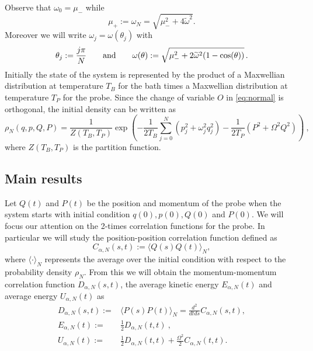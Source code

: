 \documentclass[11pt]{article}
\numberwithin{equation}{section}
\numberwithin{theorem}{section}
\def\tilde#1{\widetilde{#1}}
\begin{document}
Observe that $\omega_0=\mu_-$ while
\[
\mu_+:=\omega_N=\sqrt{\mu_-^2+4\tilde\omega^2}.
\]
Moreover we will write $\omega_j=\omega(\theta_j)$ with 
\begin{equation}\label{eq:omega-theta}
\theta_j:=\frac{j\pi}{N}\qquad\hbox{and}\qquad\omega(\theta):=\sqrt{\mu_-^2+2\tilde\omega^2(1-\cos(\theta))}\, .
\end{equation}
Initially the state of the system is represented by the product of a Maxwellian distribution at temperature $T_B$ for
the bath times a Maxwellian distribution at temperature $T_P$ for the probe. Since the change of variable $O$ in
\eqref{eq:normal} is orthogonal, the initial density can be written as
\begin{equation}\label{eq:dens_prob}
\rho_{N}(q,p,Q,P)=\frac{1}{Z(T_B,T_P)} \exp\left(-\frac 1{2T_B}\sum_{j=0}^N
(p_j^2+\omega_j^2 q_j^2)-\frac 1{2T_P} (P^2+\Omega^2Q^2)\right)\ ,
\end{equation}
where $Z(T_B,T_P)$ is the partition function.

\subsection{Main results}

Let $Q(t)$ and $P(t)$ be the position and momentum of the probe when the system starts with initial condition
$q(0),p(0),Q(0)$ and $P(0)$. We will focus our attention on the 2-times correlation functions for the probe. In
particular we will study the position-position correlation function defined as
\begin{equation}\label{eq:corr}
 C_{\alpha, N}(s,t):=\langle Q(s) Q(t)\rangle_{N},
\end{equation}
where $\langle\cdot\rangle_{N}$ represents the average over the initial condition with respect to the probability
density $\rho_{N}$. From this we will obtain the momentum-momentum correlation function $D_{\alpha, N}(s,t)$, the average 
kinetic energy $E_{\alpha, N}(t)$ and average energy $U_{\alpha, N}(t)$ as
\begin{equation}\label{eq:corrP-E}
\begin{aligned}
 D_{\alpha, N}(s,t):=&\langle P(s) P(t)\rangle_{N}=\frac{d^2}{dtds}C_{\alpha, N}(s,t),\\
 E_{\alpha, N}(t):=&\tfrac 12D_{\alpha, N}(t,t)\ ,\\
U_{\alpha, N}(t):=&\tfrac12D_{\alpha, N}(t,t)+\tfrac{\Omega^2}2 C_{\alpha,
N}(t,t).
\end{aligned}
\end{equation}
\end{document}
